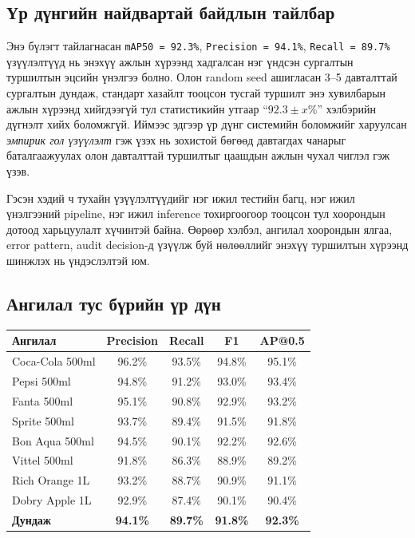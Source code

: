 \subsection{Үр дүнгийн найдвартай байдлын тайлбар}

Энэ бүлэгт тайлагнасан \texttt{mAP50 = 92.3\%}, \texttt{Precision = 94.1\%}, \texttt{Recall = 89.7\%} үзүүлэлтүүд нь энэхүү ажлын хүрээнд хадгалсан нэг үндсэн сургалтын туршилтын эцсийн үнэлгээ болно. Олон random seed ашигласан 3--5 давталттай сургалтын дундаж, стандарт хазайлт тооцсон тусгай туршилт энэ хувилбарын ажлын хүрээнд хийгдээгүй тул статистикийн утгаар ``\(92.3 \pm x\)\%'' хэлбэрийн дүгнэлт хийх боломжгүй. Иймээс эдгээр үр дүнг системийн боломжийг харуулсан \textit{эмпирик гол үзүүлэлт} гэж үзэх нь зохистой бөгөөд давтагдах чанарыг баталгаажуулах олон давталттай туршилтыг цаашдын ажлын чухал чиглэл гэж үзэв.

Гэсэн хэдий ч тухайн үзүүлэлтүүдийг нэг ижил тестийн багц, нэг ижил үнэлгээний pipeline, нэг ижил inference тохиргоогоор тооцсон тул хоорондын дотоод харьцуулалт хүчинтэй байна. Өөрөөр хэлбэл, ангилал хоорондын ялгаа, error pattern, audit decision-д үзүүлж буй нөлөөллийг энэхүү туршилтын хүрээнд шинжлэх нь үндэслэлтэй юм.

\subsection{Ангилал тус бүрийн үр дүн}

\begin{table}[H]
\centering
\caption{Ангилал тус бүрийн нарийвчлалын үнэлгээ}
\label{tab:class_results}
\begin{longtable}{|l|c|c|c|c|}
\hline
\textbf{Ангилал} & \textbf{Precision} & \textbf{Recall} & \textbf{F1} & \textbf{AP@0.5} \\
\hline
Coca-Cola 500ml & 96.2\% & 93.5\% & 94.8\% & 95.1\% \\
\hline
Pepsi 500ml & 94.8\% & 91.2\% & 93.0\% & 93.4\% \\
\hline
Fanta 500ml & 95.1\% & 90.8\% & 92.9\% & 93.2\% \\
\hline
Sprite 500ml & 93.7\% & 89.4\% & 91.5\% & 91.8\% \\
\hline
Bon Aqua 500ml & 94.5\% & 90.1\% & 92.2\% & 92.6\% \\
\hline
Vittel 500ml & 91.8\% & 86.3\% & 88.9\% & 89.2\% \\
\hline
Rich Orange 1L & 93.2\% & 88.7\% & 90.9\% & 91.1\% \\
\hline
Dobry Apple 1L & 92.9\% & 87.4\% & 90.1\% & 90.4\% \\
\hline
\textbf{Дундаж} & \textbf{94.1\%} & \textbf{89.7\%} & \textbf{91.8\%} & \textbf{92.3\%} \\
\hline
\end{longtable}
\end{table}

